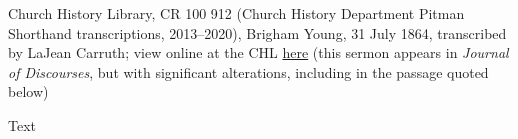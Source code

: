 					Church History Library, CR 100 912 (Church History Department Pitman Shorthand transcriptions, 2013--2020), Brigham Young, 31 July 1864, transcribed by LaJean Carruth; view online at the CHL \href{https://catalog.churchofjesuschrist.org/assets/efaf279f-2278-4c31-a138-b7522c9055cc/0/0}{here} (this sermon appears in \textit{Journal of Discourses}, but with significant alterations, including in the passage quoted below)
				
				\begin{description}
					\item[Text]
				\end{description}
				
